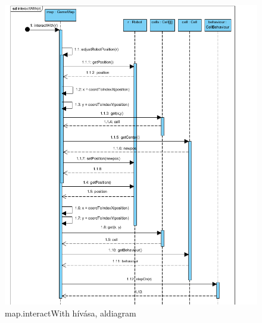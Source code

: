 \begin{figure}[!htbp]
	\begin{center}
		\includegraphics[width=\textwidth, center]{./chapters/chapter03/iw.png}
		\caption{map.interactWith hívása, aldiagram}
	\end{center}
\end{figure}

